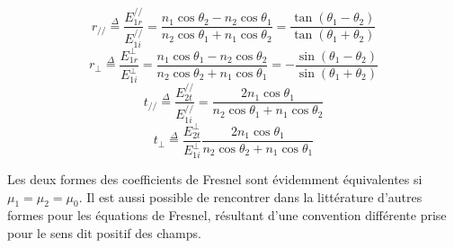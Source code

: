 
\[r_{//} \overset{\Delta}= \frac{E_{1r}^{//}}{E_{1i}^{//}} = \frac{n_{1}\cos \theta_{2} - n_{2} \cos \theta_{1} }{n_{2} \cos \theta_{1} + n_{1} \cos \theta_{2} } = \frac{\tan(\theta_{1}-\theta_{2})}{\tan(\theta_{1}+\theta_{2})}\]
\[r_{\perp} \overset{\Delta}= \frac{E_{1r}^{\perp}}{E_{1i}^{\perp}} = \frac{n_{1}\cos \theta_{1} - n_{2} \cos \theta_{2} }{n_{2} \cos \theta_{2} + n_{1} \cos \theta_{1}} = -\frac{\sin(\theta_{1} - \theta_{2})}{\sin(\theta_{1} + \theta_{2})} \]
\[t_{//} \overset{\Delta}= \frac{E_{2t}^{//}}{E_{1i}^{//}} = \frac{2 n_{1} \cos \theta_{1} }{n_{2} \cos \theta_{1} + n_{1} \cos \theta_{2}} \]
\[t_{\perp} \overset{\Delta}= \frac{E_{2t}^{\perp}}{E_{1i}^{\perp}} \frac{2 n_{1} \cos \theta_{1} }{n_{2} \cos \theta_{2} + n_{1} \cos \theta_{1}}\]


Les deux formes des coefficients de Fresnel sont évidemment équivalentes si $\mu_1 = \mu_2 = \mu_0$. Il est aussi possible de rencontrer dans la littérature d'autres formes pour les équations de Fresnel, résultant d'une convention différente prise pour le sens dit positif des champs. 
